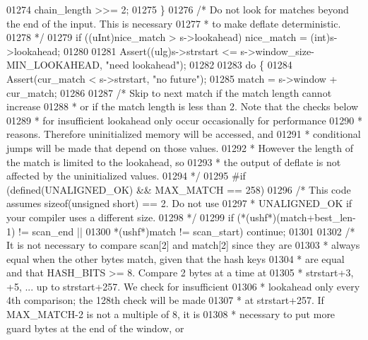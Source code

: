 \begin{DoxyCode}
{01274         chain\_length >>= 2;
01275     \}
01276     \textcolor{comment}{/* Do not look for matches beyond the end of the input. This is necessary}
01277 \textcolor{comment}{     * to make deflate deterministic.}
01278 \textcolor{comment}{     */}
01279     \textcolor{keywordflow}{if} ((uInt)nice\_match > s->lookahead) nice\_match = (int)s->lookahead;
01280 
01281     Assert((ulg)s->strstart <= s->window\_size-MIN\_LOOKAHEAD, \textcolor{stringliteral}{"need lookahead"});
01282 
01283     \textcolor{keywordflow}{do} \{
01284         Assert(cur\_match < s->strstart, \textcolor{stringliteral}{"no future"});
01285         match = s->window + cur\_match;
01286 
01287         \textcolor{comment}{/* Skip to next match if the match length cannot increase}
01288 \textcolor{comment}{         * or if the match length is less than 2.  Note that the checks below}
01289 \textcolor{comment}{         * for insufficient lookahead only occur occasionally for performance}
01290 \textcolor{comment}{         * reasons.  Therefore uninitialized memory will be accessed, and}
01291 \textcolor{comment}{         * conditional jumps will be made that depend on those values.}
01292 \textcolor{comment}{         * However the length of the match is limited to the lookahead, so}
01293 \textcolor{comment}{         * the output of deflate is not affected by the uninitialized values.}
01294 \textcolor{comment}{         */}
01295 \textcolor{preprocessor}{#if (defined(UNALIGNED\_OK) && MAX\_MATCH == 258)}
01296         \textcolor{comment}{/* This code assumes sizeof(unsigned short) == 2. Do not use}
01297 \textcolor{comment}{         * UNALIGNED\_OK if your compiler uses a different size.}
01298 \textcolor{comment}{         */}
01299         \textcolor{keywordflow}{if} (*(ushf*)(match+best\_len-1) != scan\_end ||
01300             *(ushf*)match != scan\_start) \textcolor{keywordflow}{continue};
01301 
01302         \textcolor{comment}{/* It is not necessary to compare scan[2] and match[2] since they are}
01303 \textcolor{comment}{         * always equal when the other bytes match, given that the hash keys}
01304 \textcolor{comment}{         * are equal and that HASH\_BITS >= 8. Compare 2 bytes at a time at}
01305 \textcolor{comment}{         * strstart+3, +5, ... up to strstart+257. We check for insufficient}
01306 \textcolor{comment}{         * lookahead only every 4th comparison; the 128th check will be made}
01307 \textcolor{comment}{         * at strstart+257. If MAX\_MATCH-2 is not a multiple of 8, it is}
01308 \textcolor{comment}{         * necessary to put more guard bytes at the end of the window, or}
}
\end{DoxyCode}

